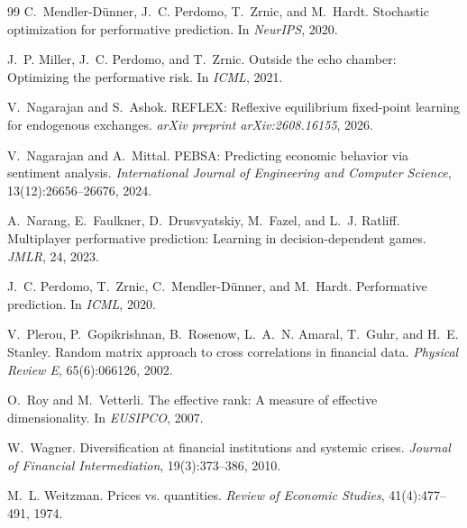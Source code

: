 \documentclass{article}
\theoremstyle{plain}
\theoremstyle{definition}
\begin{document}
\begin{thebibliography}{99}
 C.~Mendler-D\"unner, J.~C. Perdomo, T.~Zrnic, and M.~Hardt. Stochastic optimization for performative prediction. In \emph{NeurIPS}, 2020.

 J.~P. Miller, J.~C. Perdomo, and T.~Zrnic. Outside the echo chamber: Optimizing the performative risk. In \emph{ICML}, 2021.

 V.~Nagarajan and S.~Ashok. REFLEX: Reflexive equilibrium fixed-point learning for endogenous exchanges. \emph{arXiv preprint arXiv:2608.16155}, 2026.

 V.~Nagarajan and A.~Mittal. PEBSA: Predicting economic behavior via sentiment analysis. \emph{International Journal of Engineering and Computer Science}, 13(12):26656--26676, 2024.

 A.~Narang, E.~Faulkner, D.~Drusvyatskiy, M.~Fazel, and L.~J. Ratliff. Multiplayer performative prediction: Learning in decision-dependent games. \emph{JMLR}, 24, 2023.

 J.~C. Perdomo, T.~Zrnic, C.~Mendler-D\"unner, and M.~Hardt. Performative prediction. In \emph{ICML}, 2020.

 V.~Plerou, P.~Gopikrishnan, B.~Rosenow, L.~A.~N. Amaral, T.~Guhr, and H.~E. Stanley. Random matrix approach to cross correlations in financial data. \emph{Physical Review E}, 65(6):066126, 2002.

 O.~Roy and M.~Vetterli. The effective rank: A measure of effective dimensionality. In \emph{EUSIPCO}, 2007.

 W.~Wagner. Diversification at financial institutions and systemic crises. \emph{Journal of Financial Intermediation}, 19(3):373--386, 2010.

 M.~L. Weitzman. Prices vs. quantities. \emph{Review of Economic Studies}, 41(4):477--491, 1974.

\end{thebibliography}

\appendix



\newpage

\end{document}
